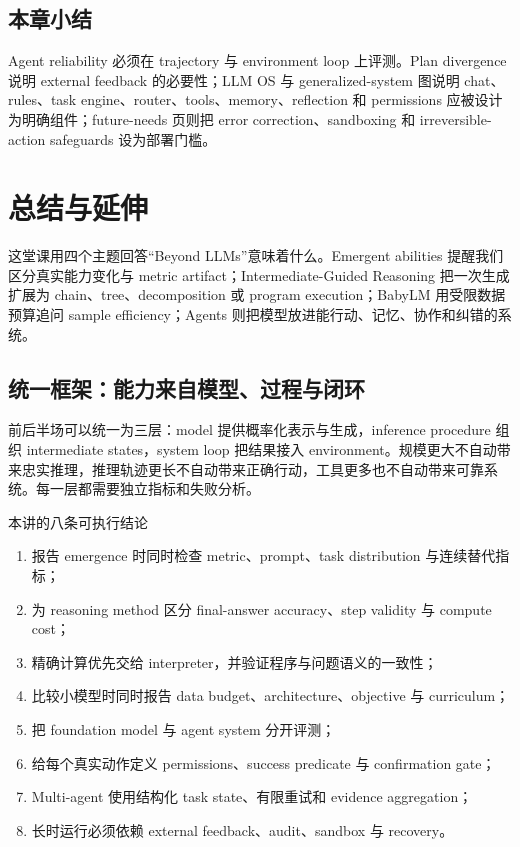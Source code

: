 \documentclass[a4paper]{article}
\begin{document}

\subsection{本章小结}

Agent reliability 必须在 trajectory 与 environment loop 上评测。Plan divergence 说明 external feedback 的必要性；LLM OS 与 generalized-system 图说明 chat、rules、task engine、router、tools、memory、reflection 和 permissions 应被设计为明确组件；future-needs 页则把 error correction、sandboxing 和 irreversible-action safeguards 设为部署门槛。

\section{总结与延伸}

这堂课用四个主题回答“Beyond LLMs”意味着什么。Emergent abilities 提醒我们区分真实能力变化与 metric artifact；Intermediate-Guided Reasoning 把一次生成扩展为 chain、tree、decomposition 或 program execution；BabyLM 用受限数据预算追问 sample efficiency；Agents 则把模型放进能行动、记忆、协作和纠错的系统。

\subsection{统一框架：能力来自模型、过程与闭环}

前后半场可以统一为三层：model 提供概率化表示与生成，inference procedure 组织 intermediate states，system loop 把结果接入 environment。规模更大不自动带来忠实推理，推理轨迹更长不自动带来正确行动，工具更多也不自动带来可靠系统。每一层都需要独立指标和失败分析。

\begin{importantbox}{本讲的八条可执行结论}
\begin{enumerate}
  \item 报告 emergence 时同时检查 metric、prompt、task distribution 与连续替代指标；
  \item 为 reasoning method 区分 final-answer accuracy、step validity 与 compute cost；
  \item 精确计算优先交给 interpreter，并验证程序与问题语义的一致性；
  \item 比较小模型时同时报告 data budget、architecture、objective 与 curriculum；
  \item 把 foundation model 与 agent system 分开评测；
  \item 给每个真实动作定义 permissions、success predicate 与 confirmation gate；
  \item Multi-agent 使用结构化 task state、有限重试和 evidence aggregation；
  \item 长时运行必须依赖 external feedback、audit、sandbox 与 recovery。
\end{enumerate}
\end{importantbox}
\end{document}
